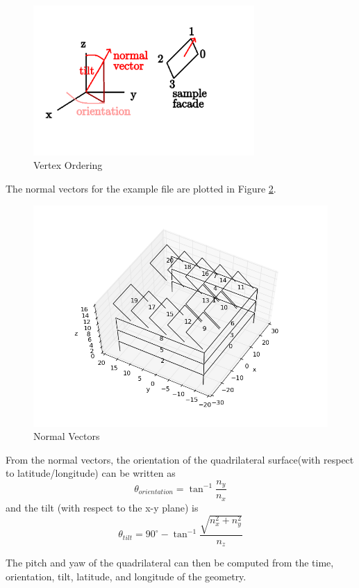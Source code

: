\documentclass[11pt]{article}
\begin{document}
\begin{figure}
\centering
\includegraphics[width=0.75\textwidth]{images/geomdefine2.png}
\caption{Vertex Ordering}
\label{fig:ordering}
\end{figure}
The normal vectors for the example file are plotted in Figure \ref{fig:normals}.
\begin{figure}
\centering
\includegraphics[width=1.0\textwidth]{images/whole-building.png}
\caption{Normal Vectors}
\label{fig:normals}
\end{figure}
From the normal vectors, the orientation of the quadrilateral surface(with respect to latitude/longitude) can be written as
\[
\theta_{orientation} = \tan^{-1}\frac{n_y}{n_x}
\]
and the tilt (with respect to the x-y plane) is
\[
\theta_{tilt} = 90^\circ - \tan^{-1}\frac{\sqrt{n_x^2+n_y^2}}{n_z}
\]

The pitch and yaw of the quadrilateral can then be computed from the time, orientation, tilt, latitude, and longitude of the geometry.
\end{document}
